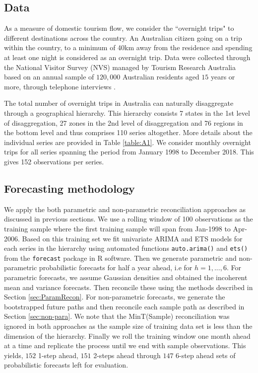 \documentclass[12pt]{article}
\theoremstyle{definition}
\begin{document}
\subsection{Data}
As a measure of domestic tourism flow, we consider the ``overnight trips" to different destinations across the country. An Australian citizen going on a trip within the country, to a minimum of 40km away from the residence and spending at least one night is considered as an overnight trip. Data were collected through the National Visitor Survey (NVS) managed by Tourism Research Australia based on an annual sample of $120,000$ Australian residents aged $15$ years or more, through telephone interviews \citep{TourismResearch2019}. 

The total number of overnight trips in Australia can naturally disaggregate through a geographical hierarchy. This hierarchy consists 7 states in the 1st level of disaggregation, 27 zones in the 2nd level of disaggregation and 76 regions in the bottom level and thus comprises 110 series altogether. More details about the individual series are provided in Table \ref{table:A1}. 
We consider monthly overnight trips for all series spanning the period from January 1998 to December 2018. This gives 152 observations per series.  

\subsection{Forecasting methodology}

We apply the both parametric and non-parametric reconciliation approaches as discussed in previous sections. We use a rolling window of 100 observations as the training sample where the first training sample will span from Jan-1998 to Apr-2006.  Based on this training set we fit univariate ARIMA and ETS models for each series in the hierarchy using automated functions \verb|auto.arima()| and \verb|ets()| from the \verb|forecast| package in R software.  
Then we generate parametric and non-parametric probabilistic forecasts for half a year ahead, i.e for $h=1,...,6$. For parametric forecasts, we assume Gaussian densities and obtained the incoherent mean and variance forecasts. Then reconcile these using the methods described in Section \ref{sec:ParamRecon}. For non-parametric forecasts, we generate the bootstrapped future paths and then reconcile each sample path as described in Section \ref{sec:non-para}. We note that the MinT(Sample) reconciliation was ignored in both approaches as the  sample size of training data set is less than the dimension of the hierarchy. Finally we roll the training window one month ahead at a time and replicate the process until we end with sample observations. This yields, $152$ 1-step ahead, $151$ 2-steps ahead through $147$ 6-step ahead sets of probabilistic forecasts left for evaluation. 
\end{document}
